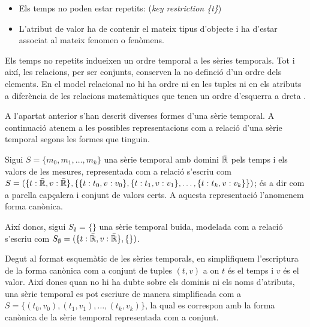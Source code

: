 \begin{itemize}
\item Els temps no poden estar repetits: (\emph{key restriction \{t\}})
\item L'atribut de valor ha de contenir el mateix tipus d'objecte i ha
  d'estar associat al mateix fenomen o fenòmens.
\end{itemize}

Els temps no repetits indueixen un ordre temporal a les sèries
temporals. Tot i així, les relacions, per ser conjunts, conserven la
no definció d'un ordre dels elements. En el model relacional no hi ha
ordre ni en les tuples ni en els atributs a diferència de les
relacions matemàtiques que tenen un ordre d'esquerra a
dreta \parencite[sec.\ 5.3]{date:introduction}.



A l'apartat anterior s'han descrit diverses formes d'una sèrie
temporal.  A continuació atenem a les possibles representacions com a
relació d'una sèrie temporal segons les formes que tinguin.




\begin{definition}
  Sigui $S = \{ m_0, m_1 , \dotsc, m_k \}$ una sèrie temporal amb
  domini $\bar{\mathbb{R}{}}$ pels temps i els valors de les mesures,
  representada com a relació s'escriu com $S = ( \{t: \bar{\mathbb{R}{}}, v:
  \bar{\mathbb{R}{}}\}, \{ \{t:t_0,v:v_0\}, \{t:t_1,v:v_1\}, \dotsc,
  \{t:t_k,v:v_k\} \} )$; és a dir com a parella capçalera i conjunt de
  valors certs. A aquesta representació l'anomenem forma canònica.

  Així doncs, sigui $S_{\emptyset} = \{ \}$ una sèrie temporal buida,
  modelada com a relació s'escriu com $S_{\emptyset} = ( \{t:
  \bar{\mathbb{R}{}}, v: \bar{\mathbb{R}{}}\}, \{ \} )$.
\end{definition}


Degut al format esquemàtic de les sèries temporals, en simplifiquem
l'escriptura de la forma canònica com a conjunt de tuples $(t,v)$ a on
$t$ és el temps i $v$ és el valor. Així doncs quan no hi ha dubte
sobre els dominis ni els noms d'atributs, una sèrie temporal es pot
escriure de manera simplificada com a $S = \{ (t_0,v_0), (t_1,v_1),
\dotsc, (t_k,v_k) \}$, la qual es correspon amb la forma canònica de
la sèrie temporal representada com a conjunt.


